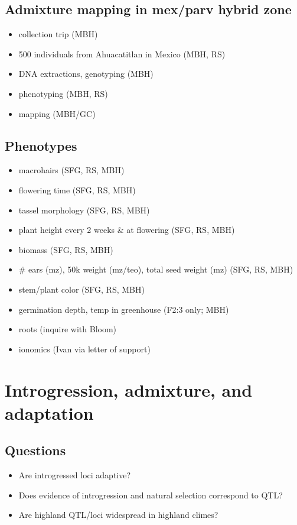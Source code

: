 \documentclass[]{article}
\begin{document}
\subsection{Admixture mapping in mex/parv hybrid zone}
\begin{itemize}
\item collection trip (MBH)
\item 500 individuals from Ahuacatitlan in Mexico (MBH, RS)
\item DNA extractions, genotyping (MBH)
\item phenotyping (MBH, RS)
\item mapping (MBH/GC)
\end{itemize}

\subsection{Phenotypes}
\begin{itemize}
\item macrohairs (SFG, RS, MBH)
\item flowering time (SFG, RS, MBH)
\item tassel morphology (SFG, RS, MBH)
\item plant height every 2 weeks \& at flowering (SFG, RS, MBH)
\item biomass (SFG, RS, MBH)
\item \# ears (mz), 50k weight (mz/teo), total seed weight (mz) (SFG, RS, MBH)
\item stem/plant color (SFG, RS, MBH)
\item germination depth, temp in greenhouse (F2:3 only; MBH)
\item roots (inquire with Bloom)
\item ionomics (Ivan via letter of support)
\end{itemize}

\section{Introgression, admixture, and adaptation}
\subsection{Questions}
\begin{itemize}
\item Are introgressed loci adaptive?
\item Does evidence of introgression and natural selection correspond to QTL?
\item Are highland QTL/loci widespread in highland climes?
\end{itemize}
\end{document}
